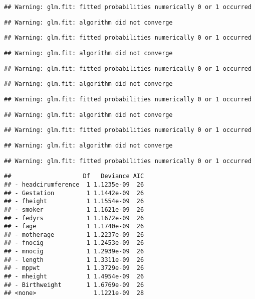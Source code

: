 \documentclass[]{article}
\begin{document}
\begin{verbatim}
## Warning: glm.fit: fitted probabilities numerically 0 or 1 occurred
\end{verbatim}

\begin{verbatim}
## Warning: glm.fit: algorithm did not converge
\end{verbatim}

\begin{verbatim}
## Warning: glm.fit: fitted probabilities numerically 0 or 1 occurred
\end{verbatim}

\begin{verbatim}
## Warning: glm.fit: algorithm did not converge
\end{verbatim}

\begin{verbatim}
## Warning: glm.fit: fitted probabilities numerically 0 or 1 occurred
\end{verbatim}

\begin{verbatim}
## Warning: glm.fit: algorithm did not converge
\end{verbatim}

\begin{verbatim}
## Warning: glm.fit: fitted probabilities numerically 0 or 1 occurred
\end{verbatim}

\begin{verbatim}
## Warning: glm.fit: algorithm did not converge
\end{verbatim}

\begin{verbatim}
## Warning: glm.fit: fitted probabilities numerically 0 or 1 occurred
\end{verbatim}

\begin{verbatim}
## Warning: glm.fit: algorithm did not converge
\end{verbatim}

\begin{verbatim}
## Warning: glm.fit: fitted probabilities numerically 0 or 1 occurred
\end{verbatim}

\begin{verbatim}
##                    Df   Deviance AIC
## - headcirumference  1 1.1235e-09  26
## - Gestation         1 1.1442e-09  26
## - fheight           1 1.1554e-09  26
## - smoker            1 1.1621e-09  26
## - fedyrs            1 1.1672e-09  26
## - fage              1 1.1740e-09  26
## - motherage         1 1.2237e-09  26
## - fnocig            1 1.2453e-09  26
## - mnocig            1 1.2939e-09  26
## - length            1 1.3311e-09  26
## - mppwt             1 1.3729e-09  26
## - mheight           1 1.4954e-09  26
## - Birthweight       1 1.6769e-09  26
## <none>                1.1221e-09  28
\end{verbatim}
\end{document}
